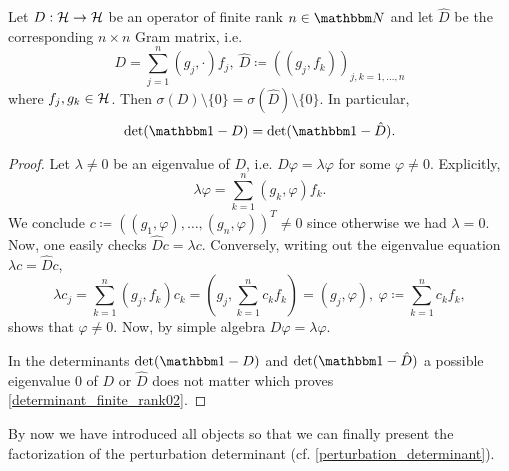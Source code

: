 \begin{lemma}\label{determinant_finite_rank}
Let $D:{\mathcal H}\to{\mathcal H}$ be an operator of finite rank $n\in\N$ and let $\hat D$ be the corresponding 
$n\times n$ Gram matrix, i.e.
\begin{equation}\label{determinant_finite_rank01}
   D = \sum_{j=1}^n (g_j,\cdot)f_j,\ \hat D\coloneqq((g_j,f_k))_{j,k=1,\ldots,n}
\end{equation}
where $f_j,g_k\in{\mathcal H}$. Then $\sigma(D)\setminus\{0\}=\sigma(\hat D)\setminus\{0\}$.
In particular,
\begin{equation}\label{determinant_finite_rank02}
   \det (\id-D) = \det (\id - \hat D) .
\end{equation}
\end{lemma}
\begin{proof}
Let $\lambda\neq 0$ be an eigenvalue of $D$, i.e. $D\varphi=\lambda\varphi$ for some $\varphi\neq 0$.
Explicitly,
\begin{equation*}
   \lambda\varphi = \sum_{k=1}^n (g_k,\varphi) f_k .
\end{equation*}
We conclude $c\coloneqq( (g_1,\varphi),\ldots,(g_n,\varphi))^T\neq 0$ since otherwise we had $\lambda=0$.
Now, one easily checks $\hat D c=\lambda c$. Conversely, writing out the eigenvalue equation $\lambda c = \hat D c$,
\begin{equation*}
  \lambda c_j = \sum_{k=1}^n (g_j,f_k)c_k = (g_j, \sum_{k=1}^n c_k f_k) = (g_j,\varphi),\ \varphi\coloneqq\sum_{k=1}^n c_kf_k,
\end{equation*}
shows that $\varphi\neq 0$. Now, by simple algebra $D\varphi=\lambda\varphi$.

In the determinants $\det(\id-D)$ and $\det(\id-\hat D)$ a possible eigenvalue $0$ of $D$ or $\hat D$
does not matter which proves \eqref{determinant_finite_rank02}.
\end{proof}

By now we have introduced all objects so that we can finally present the
factorization of the perturbation determinant (cf. \eqref{perturbation_determinant}).

